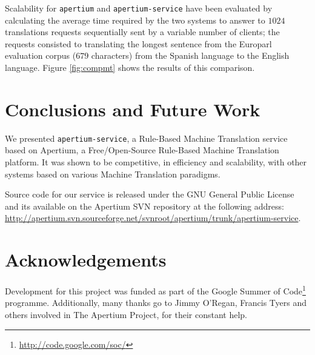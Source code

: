 \documentclass[11pt]{article}
\begin{document}
Scalability for {\tt apertium} and {\tt apertium-service} have been evaluated by calculating the average time required by the two systems to answer to $1024$ translations requests sequentially sent by a variable number of clients; the requests consisted to translating the longest sentence from the Europarl evaluation corpus ($679$ characters) from the Spanish language to the English language. Figure \ref{fig:compmt} shows the results of this comparison.


\section{Conclusions and Future Work}

We presented {\tt apertium-service}, a Rule-Based Machine Translation service based on Apertium, a Free/Open-Source Rule-Based Machine Translation platform. It was shown to be competitive, in efficiency and scalability, with other systems based on various Machine Translation paradigms. 


Source code for our service is released under the GNU General Public License and its available on the Apertium SVN repository at the following address: \url{http://apertium.svn.sourceforge.net/svnroot/apertium/trunk/apertium-service}.

\section*{Acknowledgements}

Development for this project was funded as part of the Google Summer of Code\footnote{\url{http://code.google.com/soc/}} programme.
Additionally, many thanks go to Jimmy O'Regan, Francis Tyers and others involved in The Apertium Project, for their constant help.




\end{document}
